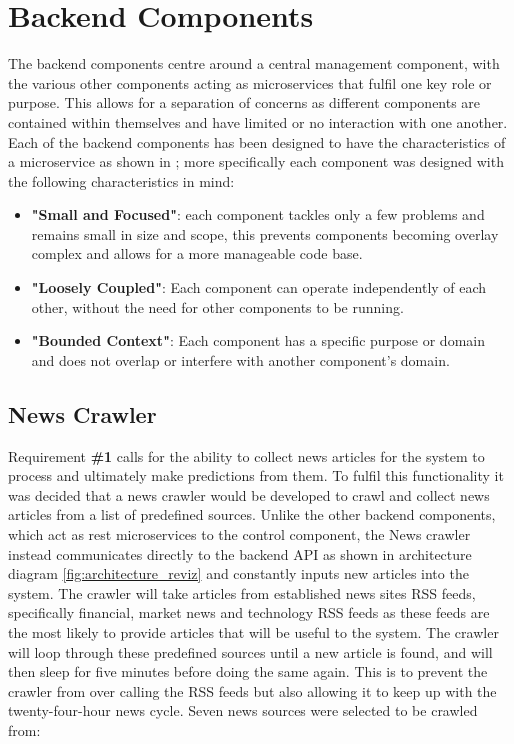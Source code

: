     
    \section{Backend Components}
    \label{Design:Back_comp}
    The backend components centre around a central management component, with the various other components acting as microservices that fulfil one key role or purpose. This allows for a separation of concerns as different components are contained within themselves and have limited or no interaction with one another. Each of the backend components has been designed to have the characteristics of a microservice as shown in \cite{microservices}; more specifically each component was designed with the following characteristics in mind: 
    
    \begin{itemize}
        \item \textbf{"Small and Focused"}: each component tackles only a few problems and remains small in size and scope, this prevents components becoming overlay complex and allows for a more manageable code base.
        
        \item \textbf{"Loosely Coupled"}: Each component can operate independently of each other, without the need for other components to be running. 
        
        \item \textbf{"Bounded Context"}: Each component has a specific purpose or domain and does not overlap or interfere with another component's domain.
    \end{itemize}
    
        \subsection{News Crawler}
        Requirement \textbf{\#1} calls for the ability to collect news articles for the system to process and ultimately make predictions from them. To fulfil this functionality it was decided that a news crawler would be developed to crawl and collect news articles from a list of predefined sources. Unlike the other backend components, which act as rest microservices to the control component, the News crawler instead communicates directly to the backend API as shown in architecture diagram \ref{fig:architecture_reviz} and constantly inputs new articles into the system. The crawler will take articles from established news sites RSS feeds, specifically financial, market news and technology RSS feeds as these feeds are the most likely to provide articles that will be useful to the system. The crawler will loop through these predefined sources until a new article is found, and will then sleep for five minutes before doing the same again. This is to prevent the crawler from over calling the RSS feeds but also allowing it to keep up with the twenty-four-hour news cycle. Seven news sources were selected to be crawled from:
        
